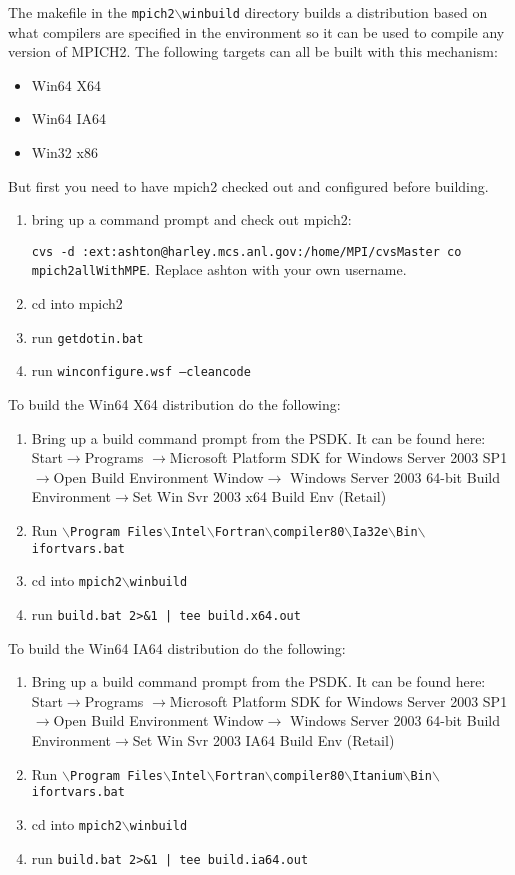 \documentclass[dvipdfm,11pt]{article}
\begin{document}
The makefile in the \texttt{mpich2$\backslash$winbuild} directory builds a distribution based 
on what compilers are specified in the environment so it can be used to compile any version of
MPICH2.  The following targets can all be built with this mechanism:
\begin{itemize}
\item Win64 X64
\item Win64 IA64
\item Win32 x86
\end{itemize}

But first you need to have mpich2 checked out and configured before building.
\begin{enumerate}
\item bring up a command prompt and check out mpich2: 

\texttt{cvs -d :ext:ashton@harley.mcs.anl.gov:/home/MPI/cvsMaster co mpich2allWithMPE}.  Replace ashton with your own username.
\item cd into mpich2
\item run \texttt{getdotin.bat}
\item run \texttt{winconfigure.wsf --cleancode}
\end{enumerate}

To build the Win64 X64 distribution do the following:
\begin{enumerate}
\item Bring up a build command prompt from the PSDK.  It can be found here: Start$\to$Programs
$\to$Microsoft Platform SDK for Windows Server 2003 SP1$\to$Open Build Environment Window$\to$
Windows Server 2003 64-bit Build Environment$\to$Set Win Svr 2003 x64 Build Env (Retail)
\item Run \texttt{$\backslash$Program Files$\backslash$Intel$\backslash$Fortran$\backslash$compiler80$\backslash$Ia32e$\backslash$Bin$\backslash$ifortvars.bat}
\item cd into \texttt{mpich2$\backslash$winbuild}
\item run \texttt{build.bat 2>\&1 | tee build.x64.out}
\end{enumerate}

To build the Win64 IA64 distribution do the following:
\begin{enumerate}
\item Bring up a build command prompt from the PSDK.  It can be found here: Start$\to$Programs
$\to$Microsoft Platform SDK for Windows Server 2003 SP1$\to$Open Build Environment Window$\to$
Windows Server 2003 64-bit Build Environment$\to$Set Win Svr 2003 IA64 Build Env (Retail)
\item Run \texttt{$\backslash$Program Files$\backslash$Intel$\backslash$Fortran$\backslash$compiler80$\backslash$Itanium$\backslash$Bin$\backslash$ifortvars.bat}
\item cd into \texttt{mpich2$\backslash$winbuild}
\item run \texttt{build.bat 2>\&1 | tee build.ia64.out}
\end{enumerate}
\end{document}
